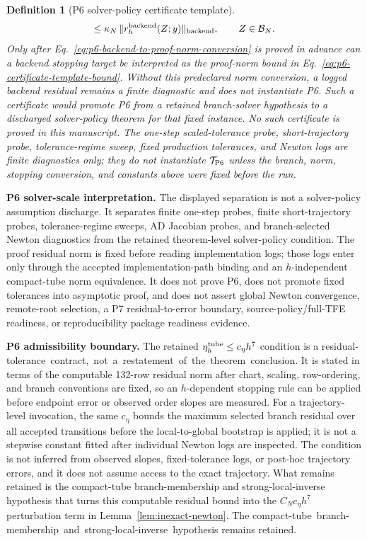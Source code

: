 \documentclass[preprint,12pt]{elsarticle}
\newtheorem{definition}{Definition}
\newcommand{\tfe}{TFE}
\begin{document}
\begin{definition}[P6 solver-policy certificate template]
\begin{equation}
  \le
  \kappa_N\,
  \|r_h^{\rm backend}(Z;y)\|_{\rm backend},
  \qquad Z\in\mathcal B_N .
\end{equation}
Only after Eq.~\eqref{eq:p6-backend-to-proof-norm-conversion} is proved in
advance can a backend stopping target be interpreted as the proof-norm bound
in Eq.~\eqref{eq:p6-certificate-template-bound}.  Without this predeclared
norm conversion, a logged backend residual remains a finite diagnostic and
does not instantiate P6.
Such a certificate would promote P6 from a retained branch-solver hypothesis
to a discharged solver-policy theorem for that fixed instance.  No such
certificate is proved in this manuscript.  The one-step scaled-tolerance
probe, short-trajectory probe, tolerance-regime sweep, fixed production
tolerances, and Newton logs are finite diagnostics only; they do not
instantiate \(\mathcal T_{\rm P6}\) unless the branch, norm, stopping
conversion, and constants above were fixed before the run.
\end{definition}

\noindent\textbf{P6 solver-scale interpretation.}
The displayed separation is not a
solver-policy assumption discharge. It separates
finite one-step probes, finite short-trajectory probes, tolerance-regime
sweeps, AD Jacobian probes, and branch-selected Newton diagnostics from the
retained theorem-level solver-policy condition. The proof residual norm is
fixed before reading implementation logs; those logs enter only through the
accepted implementation-path binding and an \(h\)-independent compact-tube norm
equivalence. It does not prove P6, does not promote fixed tolerances into
asymptotic proof, and does not assert global Newton convergence, remote-root
selection, a P7 residual-to-error boundary, source-policy/full-\tfe{}
readiness, or reproducibility package readiness evidence.

\noindent\textbf{P6 admissibility boundary.}
The retained
\(\eta_h^{\rm tube}\le c_\eta h^7\) condition is a
\mbox{residual-tolerance contract, not a restatement of the theorem conclusion}.  It is stated in terms
of the computable 132-row residual norm after chart, scaling, row-ordering,
and branch conventions are fixed, so an \(h\)-dependent stopping rule can be
applied before endpoint error or observed order slopes are measured. For a
trajectory-level invocation, the same \(c_\eta\) bounds the maximum selected
branch residual over all accepted transitions before the local-to-global
bootstrap is applied; it is not a stepwise constant fitted after individual
Newton logs are inspected. The
condition is not inferred from observed slopes, fixed-tolerance logs, or
post-hoc trajectory errors, and it does not assume access to the exact
trajectory. What remains retained is the compact-tube branch-membership and
strong-local-inverse hypothesis that turns this computable residual bound
into the \(C_Nc_\eta h^7\) perturbation term in
Lemma~\ref{lem:inexact-newton}.
The \mbox{compact-tube branch-membership and strong-local-inverse hypothesis}
remains retained.
\end{document}

